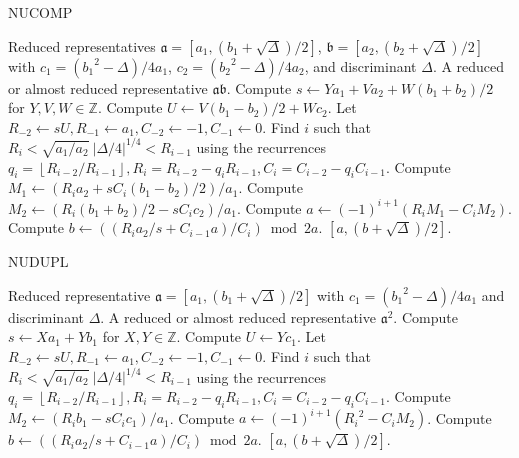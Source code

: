 \documentclass{ucalgthes1}
\theoremstyle{plain}
\theoremstyle{definition}
\newcommand{\ZZ}{\mathbb{Z}}
\newcommand{\floor}[1]{\left\lfloor #1 \right\rfloor}
\begin{document}
\begin{comment}
\begin{algorithm}[h]
\caption{Is Ambiguous?}
\label{alg:ambiguous}
\begin{algorithmic}[1]
\REQUIRE A reduced representative $\mathfrak a = [a, (b+\sqrt\Delta)/2]$.
\ENSURE True if $\mathfrak a$ is ambiguous, False otherwise.
\IF {$a > 1$}
	\IF {$b = 0$ or $a = b$ or $a = c$}
		\RETURN True.
	\ENDIF
\ENDIF
\RETURN False.
\end{algorithmic}
\end{algorithm}
\end{comment}

\begin{algorithm}[h]
\caption{NUCOMP}
\label{alg:nucomp}
\begin{algorithmic}[1]
\REQUIRE Reduced representatives $\mathfrak a = [a_1, (b_1+\sqrt\Delta)/2]$, $\mathfrak b = [a_2, (b_2+\sqrt\Delta)/2]$ with \break $c_1 = ({b_1}^2-\Delta)/4a_1$, $c_2 = ({b_2}^2-\Delta)/4a_2$, and discriminant $\Delta$.
\ENSURE A reduced or almost reduced representative $\mathfrak a \mathfrak b$.
\STATE Compute $s \leftarrow Ya_1 + Va_2 + W (b_1+b_2)/2$ for $Y, V, W \in \ZZ$.
\STATE Compute $U \leftarrow V(b_1-b_2)/2 + Wc_2$.
\STATE Let $R_{-2} \leftarrow sU, R_{-1} \leftarrow a_1, C_{-2} \leftarrow -1, C_{-1} \leftarrow 0$.
\STATE Find $i$ such that $R_i < \sqrt{a_1/a_2} ~ |\Delta/4|^{1/4} < R_{i-1}$ using the recurrences \break $q_i = \floor{R_{i-2}/R_{i-1}}, R_i = R_{i-2}-q_i R_{i-1}, C_i=C_{i-2}-q_i C_{i-1}$.
\STATE Compute $M_1 \leftarrow (R_i a_2 + sC_i(b_1-b_2)/2)/a_1$.
\STATE Compute $M_2 \leftarrow (R_i (b_1+b_2)/2 -sC_i c_2)/a_1$.
\STATE Compute $a \leftarrow (-1)^{i+1}(R_i M_1 - C_i M_2)$.
\STATE Compute $b \leftarrow ((R_i a_2/s + C_{i-1} a)/C_i) \bmod{2a}$.
\RETURN $[a, (b+\sqrt\Delta)/2]$.
\end{algorithmic}
\end{algorithm}

\begin{algorithm}[h]
\caption{NUDUPL}
\label{alg:nudupl}
\begin{algorithmic}[1]
\REQUIRE Reduced representative $\mathfrak a = [a_1, (b_1+\sqrt\Delta)/2]$ with $c_1 = ({b_1}^2-\Delta)/4a_1$ and discriminant $\Delta$.
\ENSURE A reduced or almost reduced representative $\mathfrak a^2$.
\STATE Compute $s \leftarrow Xa_1 + Yb_1$ for $X,Y \in \ZZ$.
\STATE Compute $U \leftarrow Yc_1$.
\STATE Let $R_{-2} \leftarrow sU, R_{-1} \leftarrow a_1, C_{-2} \leftarrow -1, C_{-1} \leftarrow 0$.
\STATE Find $i$ such that $R_i < \sqrt{a_1/a_2} ~ |\Delta/4|^{1/4} < R_{i-1}$ using the recurrences \break $q_i = \floor{R_{i-2}/R_{i-1}}, R_i = R_{i-2}-q_i R_{i-1}, C_i=C_{i-2}-q_i C_{i-1}$.
\STATE Compute $M_2 \leftarrow (R_i b_1 -sC_i c_1)/a_1$.
\STATE Compute $a \leftarrow (-1)^{i+1}({R_i}^2 - C_i M_2)$.
\STATE Compute $b \leftarrow ((R_i a_2/s + C_{i-1} a)/C_i) \bmod{2a}$.
\RETURN $[a, (b+\sqrt\Delta)/2]$.
\end{algorithmic}
\end{algorithm}
\end{document}
